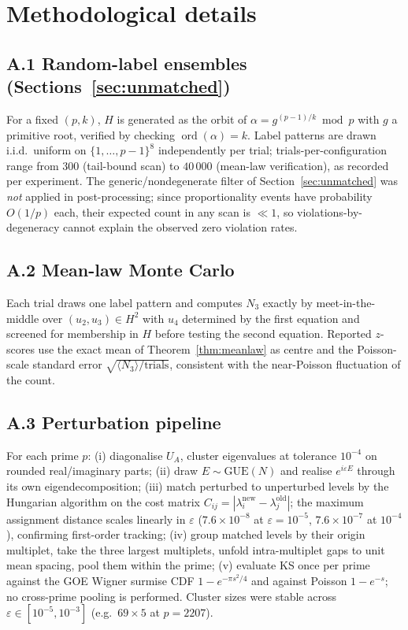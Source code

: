 \documentclass[11pt]{article}
\begin{document}
\appendix
\section{Methodological details}\label{app:method}

\subsection*{A.1 Random-label ensembles (Sections~\ref{sec:unmatched})}
For a fixed $(p,k)$, $H$ is generated as the orbit of
$\alpha=g^{(p-1)/k}\bmod p$ with $g$ a primitive root, verified by
checking $\operatorname{ord}(\alpha)=k$. Label patterns are drawn
i.i.d.\ uniform on $\{1,\dots,p-1\}^{8}$ independently per trial;
trials-per-configuration range from $300$ (tail-bound scan) to
$40\,000$ (mean-law verification), as recorded per experiment. The
generic/nondegenerate filter of Section~\ref{sec:unmatched} was
\emph{not} applied in post-processing; since proportionality events
have probability $O(1/p)$ each, their expected count in any scan is
${\ll}1$, so violations-by-degeneracy cannot explain the observed zero
violation rates.

\subsection*{A.2 Mean-law Monte Carlo}
Each trial draws one label pattern and computes $N_3$ exactly by
meet-in-the-middle over $(u_2,u_3)\in H^2$ with $u_4$ determined by
the first equation and screened for membership in $H$ before testing
the second equation. Reported $z$-scores use the exact mean of
Theorem~\ref{thm:meanlaw} as centre and the Poisson-scale
standard error $\sqrt{\langle N_3\rangle/\text{trials}}$, consistent
with the near-Poisson fluctuation of the count.

\subsection*{A.3 Perturbation pipeline}
For each prime $p$: (i) diagonalise $U_A$, cluster eigenvalues at
tolerance $10^{-4}$ on rounded real/imaginary parts; (ii) draw
$E\sim\mathrm{GUE}(N)$ and realise $e^{i\varepsilon E}$ through its
own eigendecomposition; (iii) match perturbed to unperturbed levels by
the Hungarian algorithm on the cost matrix
$C_{ij}=|\lambda_i^{\mathrm{new}}-\lambda_j^{\mathrm{old}}|$; the
maximum assignment distance scales linearly in $\varepsilon$
($7.6\times10^{-8}$ at $\varepsilon=10^{-5}$,
$7.6\times10^{-7}$ at $10^{-4}$), confirming first-order tracking;
(iv) group matched levels by their origin multiplet, take the three
largest multiplets, unfold intra-multiplet gaps to unit mean spacing,
pool them within the prime; (v) evaluate KS once per prime against
the GOE Wigner surmise CDF $1-e^{-\pi s^2/4}$ and against Poisson
$1-e^{-s}$; no cross-prime pooling is performed. Cluster sizes were
stable across $\varepsilon\in[10^{-5},10^{-3}]$ (e.g.\ $69\times5$ at
$p=2207$).
\end{document}
